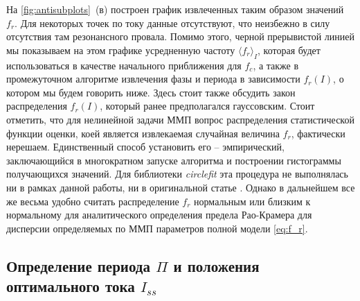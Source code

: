 \documentclass[14pt, a4paper]{extreport}
\numberwithin{equation}{section}
\begin{document}
На \autoref{fig:antisubplots}~(в) построен график извлеченных таким образом значений $f_r$. Для некоторых точек по току данные отсутствуют, что неизбежно в силу отсутствия там резонансного провала. Помимо этого, черной прерывистой линией мы показываем на этом графике усредненную частоту $\langle f_r\rangle_I$, которая будет использоваться в качестве начального приближения для $f_c$, а также в промежуточном алгоритме извлечения фазы и периода в зависимости $f_r(I)$, о котором мы будем говорить ниже. Здесь стоит также обсудить закон распределения $f_r(I)$, который ранее предполагался гауссовским. Стоит отметить, что для нелинейной задачи ММП вопрос распределения статистической функции оценки, коей является извлекаемая случайная величина $f_r$, фактически нерешаем. Единственный способ установить его -- эмпирический, заключающийся в многократном запуске алгоритма и построении гистограммы получающихся значений. Для библиотеки \foreignlanguage{english}{\textit{circlefit}} эта процедура не выполнялась ни в рамках данной работы, ни в оригинальной статье \cite{probst2015efficient}. Однако в дальнейшем все же весьма удобно считать распределение $f_r$ нормальным или близким к нормальному для аналитического определения предела Рао\hyp Крамера для дисперсии определяемых по ММП параметров полной модели \eqref{eq:f_r}.

\subsection{Определение периода $\Pi$ и положения оптимального тока $I_{ss}$}
\end{document}
